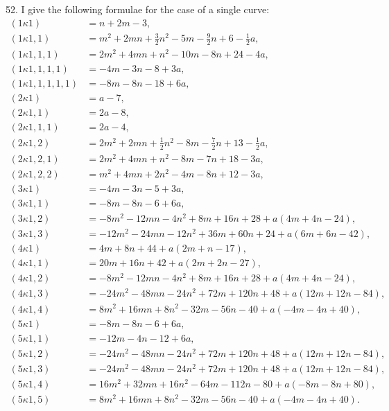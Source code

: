\documentclass[12pt,a4paper]{article}
\begin{document}
52. I give the following formulae for the case of a single curve:
\begin{align*}
(1 \kappa 1) &= n + 2m - 3,\\
(1 \kappa 1, 1) &= m^2 + 2mn + \tfrac{3}{2}n^2 - 5m - \tfrac{9}{2}n + 6 - \tfrac{1}{2}a,\\
(1 \kappa 1, 1, 1) &= 2m^2 + 4mn + n^2 - 10m - 8n + 24 - 4a,\\
(1 \kappa 1, 1, 1, 1) &= -4m - 3n - 8 + 3a,\\
(1 \kappa 1, 1, 1, 1, 1) &= -8m - 8n - 18 + 6a,\\
(2 \kappa 1) &= a - 7,\\
(2 \kappa 1, 1) &= 2a - 8,\\
(2 \kappa 1, 1, 1) &= 2a - 4,\\
(2 \kappa 1, 2) &= 2m^2 + 2mn + \tfrac{1}{2}n^2 - 8m - \tfrac{7}{2}n + 13 - \tfrac{1}{2}a,\\
(2 \kappa 1, 2, 1) &= 2m^2 + 4mn + n^2 - 8m - 7n + 18 - 3a,\\
(2 \kappa 1, 2, 2) &= m^2 + 4mn + 2n^2 - 4m - 8n + 12 - 3a,\\
(3 \kappa 1) &= -4m - 3n - 5 + 3a,\\
(3 \kappa 1, 1) &= -8m - 8n - 6 + 6a,\\
(3 \kappa 1, 2) &= -8m^2 - 12mn - 4n^2 + 8m + 16n + 28 + a(4m + 4n - 24),\\
(3 \kappa 1, 3) &= -12m^2 - 24mn - 12n^2 + 36m + 60n + 24 + a(6m + 6n - 42),\\
(4 \kappa 1) &= 4m + 8n + 44 + a(2m + n - 17),\\
(4 \kappa 1, 1) &= 20m + 16n + 42 + a(2m + 2n - 27),\\
(4 \kappa 1, 2) &= -8m^2 - 12mn - 4n^2 + 8m + 16n + 28 + a(4m + 4n - 24),\\
(4 \kappa 1, 3) &= -24m^2 - 48mn - 24n^2 + 72m + 120n + 48 + a(12m + 12n - 84),\\
(4 \kappa 1, 4) &= 8m^2 + 16mn + 8n^2 - 32m - 56n - 40 + a(-4m - 4n + 40),\\
(5 \kappa 1) &= -8m - 8n - 6 + 6a,\\
(5 \kappa 1, 1) &= -12m - 4n - 12 + 6a,\\
(5 \kappa 1, 2) &= -24m^2 - 48mn - 24n^2 + 72m + 120n + 48 + a(12m + 12n - 84),\\
(5 \kappa 1, 3) &= -24m^2 - 48mn - 24n^2 + 72m + 120n + 48 + a(12m + 12n - 84),\\
(5 \kappa 1, 4) &= 16m^2 + 32mn + 16n^2 - 64m - 112n - 80 + a(-8m - 8n + 80),\\
(5 \kappa 1, 5) &= 8m^2 + 16mn + 8n^2 - 32m - 56n - 40 + a(-4m - 4n + 40).
\end{align*}
\end{document}
